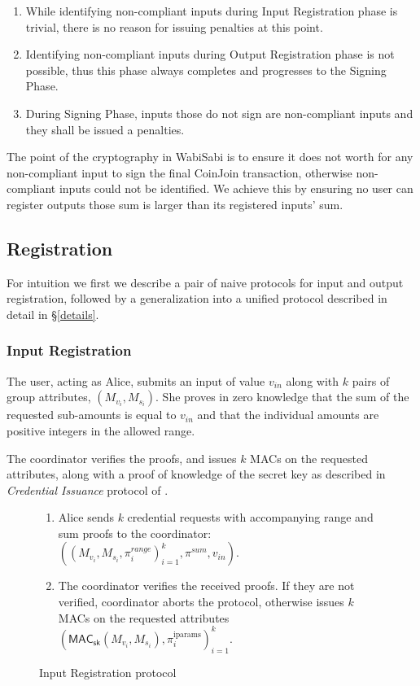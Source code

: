 \documentclass{article}
\begin{document}
\begin{enumerate}
    \item While identifying non-compliant inputs during Input Registration phase is trivial, there is no reason for issuing penalties at this point.
    \item Identifying non-compliant inputs during Output Registration phase is not possible, thus this phase always completes and progresses to the Signing Phase.
    \item During Signing Phase, inputs those do not sign are non-compliant inputs and they shall be issued a penalties.
\end{enumerate}

The point of the cryptography in WabiSabi is to ensure it does not worth for any non-compliant input to sign the final CoinJoin transaction, otherwise non-compliant inputs could not be identified. We achieve this by ensuring no user can register outputs those sum is larger than its registered inputs' sum.

\subsection{Registration}

For intuition we first we describe a pair of naive protocols for input and output registration, followed by a generalization into a unified protocol described in detail in \S\ref{details}.

\subsubsection{Input Registration}

The user, acting as Alice, submits an input of value $v_{\mathit{in}}$ along with $k$ pairs of group attributes,
$(M_{v_i}, M_{s_i})$.
She proves in zero knowledge that the sum of the requested sub-amounts is equal to $v_{\mathit{in}}$ and that the individual amounts are positive integers in the allowed range.

The coordinator verifies the proofs, and issues $k$ MACs on the requested attributes, along with a proof of knowledge of the secret key as described in \textit{Credential Issuance} protocol of \cite{chase2019signal}.

\begin{figure}
    \begin{mdframed}
    \begin{enumerate}
        \item Alice sends $k$ credential requests with accompanying range and sum proofs to the coordinator:  $((M_{v_i},M_{s_i},\pi^{\textit{range}}_{i})^{k}_{i=1},\pi^{sum},v_{\textit{in}})$.
        \item The coordinator verifies the received proofs. If they are not verified, coordinator aborts the protocol, otherwise issues $k$ MACs on the requested attributes $(\mathsf{MAC}_\mathsf{sk}(M_{v_i},M_{s_i}), \pi_i^{\mathrm{iparams}})^{k}_{i=1}$.
    \end{enumerate}

\end{mdframed}
    \caption{Input Registration protocol}
    \label{fig:inputreg}
\end{figure}
\end{document}
